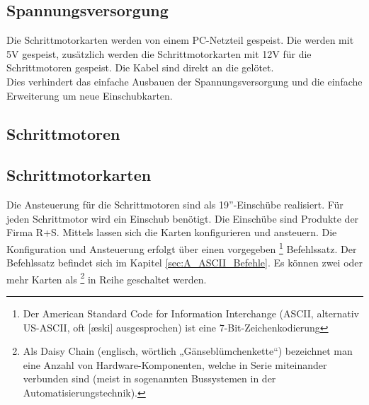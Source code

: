 \subsection{Spannungsversorgung}
Die Schrittmotorkarten werden von einem PC-Netzteil gespeist. Die  werden mit 5V gespeist, zusätzlich werden die Schrittmotorkarten mit 12V für die Schrittmotoren gespeist. Die Kabel sind direkt an die  gelötet.\\
Dies verhindert das einfache Ausbauen der Spannungsversorgung und die einfache Erweiterung um neue Einschubkarten.
\subsection{Schrittmotoren}

\subsection{Schrittmotorkarten}
Die Ansteuerung für die Schrittmotoren sind als 19''-Einschübe realisiert. Für jeden Schrittmotor wird ein Einschub benötigt.
Die Einschübe sind Produkte der Firma R+S. Mittels  lassen sich die Karten konfigurieren und ansteuern. Die Konfiguration und Ansteuerung erfolgt über einen vorgegeben 
\footnote{Der American Standard Code for Information Interchange (ASCII, alternativ US-ASCII, oft [æski] ausgesprochen) ist eine 7-Bit-Zeichenkodierung\cite{wiki:ASCII}}
 Befehlssatz. Der Befehlssatz befindet sich im Kapitel \ref{sec:A_ASCII_Befehle}. Es können zwei oder mehr Karten als 
\footnote{Als Daisy Chain (englisch, wörtlich „Gänseblümchenkette“) bezeichnet man eine Anzahl von Hardware-Komponenten, welche in Serie miteinander verbunden sind (meist in sogenannten Bussystemen in der Automatisierungstechnik).\cite{wiki:Daisy} } 
in Reihe geschaltet werden.
